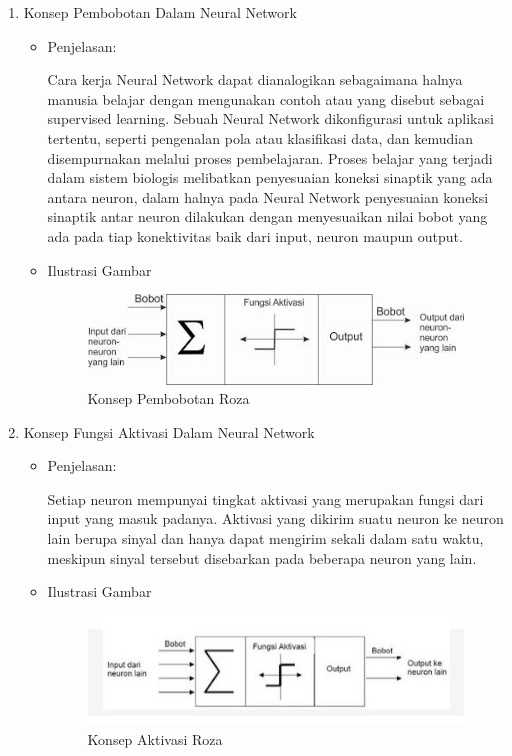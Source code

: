 \begin{enumerate}
\item Konsep Pembobotan Dalam Neural Network
\begin{itemize}
\item Penjelasan:
\par Cara kerja Neural Network dapat dianalogikan sebagaimana halnya manusia belajar dengan mengunakan contoh atau yang disebut sebagai supervised learning. Sebuah Neural Network dikonfigurasi untuk aplikasi tertentu, seperti pengenalan pola atau klasifikasi data, dan kemudian disempurnakan melalui proses pembelajaran. Proses belajar yang terjadi dalam sistem biologis melibatkan penyesuaian koneksi sinaptik yang ada antara neuron, dalam halnya pada Neural Network penyesuaian koneksi sinaptik antar neuron dilakukan dengan menyesuaikan nilai bobot yang ada pada tiap konektivitas baik dari input, neuron maupun output.
\par
\item Ilustrasi Gambar
\begin{figure}[!hbtp]
\centering
\includegraphics[scale=0.5]{figures/pemboobotanroza.jpg}
\caption{Konsep Pembobotan Roza}
\label{text-fadila}
\end{figure}
\par
\end{itemize}
\par
\par

\item Konsep Fungsi Aktivasi Dalam Neural Network
\begin{itemize}
\item Penjelasan:
\par Setiap neuron mempunyai tingkat aktivasi yang merupakan fungsi dari input yang masuk padanya. Aktivasi yang dikirim suatu neuron ke neuron lain berupa sinyal dan hanya dapat mengirim sekali dalam satu waktu, meskipun sinyal tersebut disebarkan pada beberapa neuron yang lain.
\par
\item Ilustrasi Gambar
\begin{figure}[!hbtp]
\centering
\includegraphics[scale=0.7]{figures/aktivasiroza.jpg}
\caption{Konsep Aktivasi Roza}
\label{text-fadila}
\end{figure}
\par
\end{itemize}
\par
\par


\end{enumerate}
